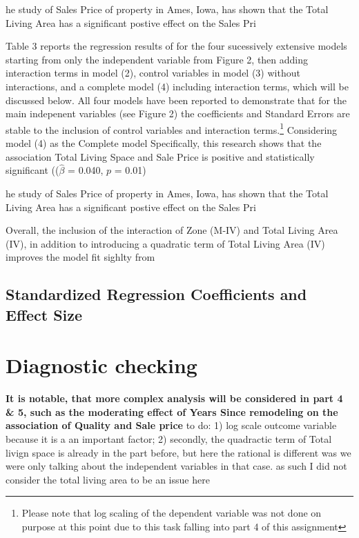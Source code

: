 \documentclass[a4paper]{article}
\begin{document}
he study of Sales Price of property in Ames, Iowa, has shown that the Total Living Area has a significant postive effect on the Sales Pri


Table 3 reports the regression results of  for the four sucessively extensive models starting from only the independent variable from Figure 2, then adding interaction terms in model (2), control variables in model (3) without interactions, and a complete model (4) including interaction terms, which will be discussed below. All four models have been reported to demonstrate that for the main indepenent variables (see Figure 2) the coefficients and Standard Errors are stable to the inclusion of control variables and interaction terms.\footnote{Please note that log scaling of the dependent variable was not done on purpose at this point due to this task falling into part 4 of this assignment}
Considering model (4) as the Complete model
Specifically, this research shows that the association Total Living Space and Sale Price is positive and  statistically significant (($\hat{\beta}$ = 0.040, $p$ = 0.01)


he study of Sales Price of property in Ames, Iowa, has shown that the Total Living Area has a significant postive effect on the Sales Pri

Overall, the inclusion of the interaction of Zone (M-IV) and Total Living Area (IV), in addition to introducing a quadratic term of Total Living Area (IV) improves the model fit sighlty from 


\subsection{Standardized Regression Coefficients and Effect Size}










\section{Diagnostic checking}
\textbf{It is notable, that more complex analysis will be considered in part 4 \& 5, such as the moderating effect of Years Since remodeling on the association of Quality and Sale price}
to do: 1) log scale outcome variable because it is a an important factor; 2) secondly, the quadractic term of Total livign space is already in the part before, but here the rational is different was we were only talking about the independent variables in that case. as such I did not consider the total living area to be an issue here 
\end{document}
